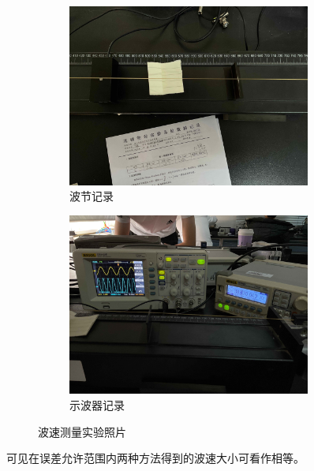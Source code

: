 \documentclass[UTF8]{article}
\theoremstyle{MyLineTheoremStyle} %
\theoremstyle{MyBlockTheoremStyle} %
\theoremstyle{MySubsubsectionStyle} %
\begin{document}
\begin{figure}[H]\centering
\begin{subfigure}[b]{0.5\columnwidth}\centering
    \includegraphics[height=170pt]{assets/波速测量 波节.jpg}
    \caption{波节记录}
\end{subfigure}\hfill
\begin{subfigure}[b]{0.5\columnwidth}\centering
    \includegraphics[height=170pt]{assets/波速测量 示波器.jpg}
    \caption{示波器记录}
\end{subfigure}
\caption{波速测量实验照片}
\end{figure}
可见在误差允许范围内两种方法得到的波速大小可看作相等。
\end{document}
